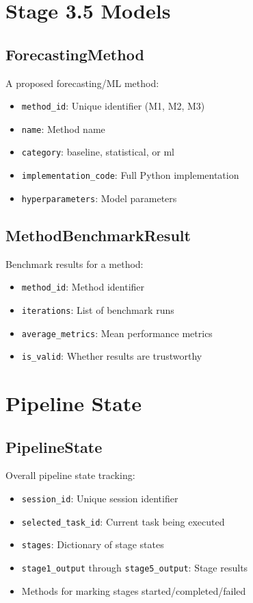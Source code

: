 \documentclass[12pt,a4paper]{report}
\begin{document}
\section{Stage 3.5 Models}
\subsection{ForecastingMethod}
A proposed forecasting/ML method:
\begin{itemize}
    \item \texttt{method\_id}: Unique identifier (M1, M2, M3)
    \item \texttt{name}: Method name
    \item \texttt{category}: baseline, statistical, or ml
    \item \texttt{implementation\_code}: Full Python implementation
    \item \texttt{hyperparameters}: Model parameters
\end{itemize}

\subsection{MethodBenchmarkResult}
Benchmark results for a method:
\begin{itemize}
    \item \texttt{method\_id}: Method identifier
    \item \texttt{iterations}: List of benchmark runs
    \item \texttt{average\_metrics}: Mean performance metrics
    \item \texttt{is\_valid}: Whether results are trustworthy
\end{itemize}

\section{Pipeline State}
\subsection{PipelineState}
Overall pipeline state tracking:
\begin{itemize}
    \item \texttt{session\_id}: Unique session identifier
    \item \texttt{selected\_task\_id}: Current task being executed
    \item \texttt{stages}: Dictionary of stage states
    \item \texttt{stage1\_output} through \texttt{stage5\_output}: Stage results
    \item Methods for marking stages started/completed/failed
\end{itemize}
\end{document}
